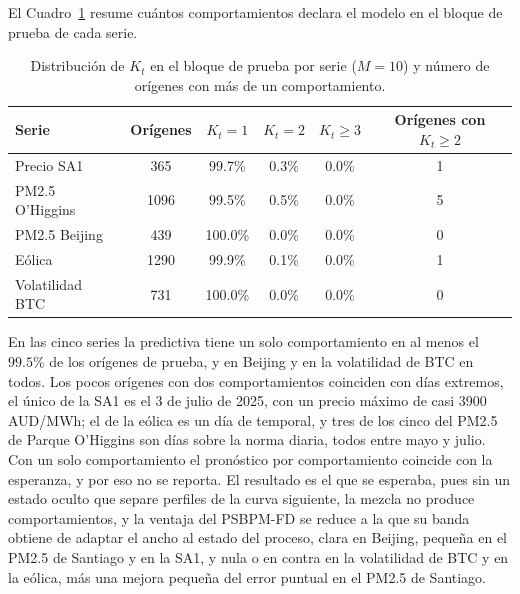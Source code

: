El Cuadro~\ref{tab:aneD_K} resume cuántos comportamientos declara el modelo en el bloque de prueba de cada serie.

\begin{table}[H]
\centering\small
\setlength{\tabcolsep}{3.5pt}
\caption{Distribución de $K_t$ en el bloque de prueba por serie ($M = 10$) y número de orígenes con más de un comportamiento.}
\label{tab:aneD_K}
\begin{tabular}{l c ccc c}
\hline
Serie & Orígenes & $K_t = 1$ & $K_t = 2$ & $K_t \ge 3$ & Orígenes con $K_t \ge 2$ \\
\hline
Precio SA1 & 365 & 99.7\% & 0.3\% & 0.0\% & 1 \\
PM2.5 O'Higgins & 1096 & 99.5\% & 0.5\% & 0.0\% & 5 \\
PM2.5 Beijing & 439 & 100.0\% & 0.0\% & 0.0\% & 0 \\
Eólica & 1290 & 99.9\% & 0.1\% & 0.0\% & 1 \\
Volatilidad BTC & 731 & 100.0\% & 0.0\% & 0.0\% & 0 \\
\hline
\end{tabular}
\end{table}

En las cinco series la predictiva tiene un solo comportamiento en al menos el $99.5\%$ de los orígenes de prueba, y en Beijing y en la volatilidad de BTC en todos. Los pocos orígenes con dos comportamientos coinciden con días extremos, el único de la SA1 es el 3 de julio de 2025, con un precio máximo de casi 3900 AUD/MWh; el de la eólica es un día de temporal, y tres de los cinco del PM2.5 de Parque O'Higgins son días sobre la norma diaria, todos entre mayo y julio. Con un solo comportamiento el pronóstico por comportamiento coincide con la esperanza, y por eso no se reporta. El resultado es el que se esperaba, pues sin un estado oculto que separe perfiles de la curva siguiente, la mezcla no produce comportamientos, y la ventaja del PSBPM-FD se reduce a la que su banda obtiene de adaptar el ancho al estado del proceso, clara en Beijing, pequeña en el PM2.5 de Santiago y en la SA1, y nula o en contra en la volatilidad de BTC y en la eólica, más una mejora pequeña del error puntual en el PM2.5 de Santiago.
